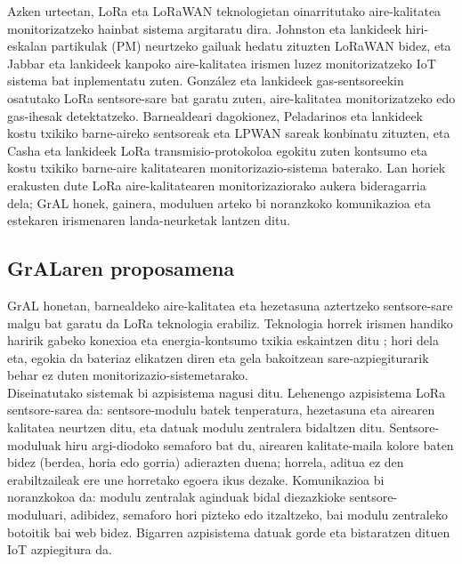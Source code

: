 \documentclass[10pt]{article}
\newcommand{\acpar}[1]{(\acs{#1})\acused{#1}}
\begin{document}
Azken urteetan, \ac{LoRa} eta \ac{LoRaWAN} teknologietan oinarritutako aire-kalitatea monitorizatzeko hainbat sistema argitaratu dira. Johnston eta lankideek \cite{johnston2019} hiri-eskalan partikulak \acpar{PM} neurtzeko gailuak hedatu zituzten \ac{LoRaWAN} bidez, eta Jabbar eta lankideek \cite{jabbar2022} kanpoko aire-kalitatea irismen luzez monitorizatzeko \ac{IoT} sistema bat inplementatu zuten. González eta lankideek \cite{gonzalez2020} gas-sentsoreekin osatutako \ac{LoRa} sentsore-sare bat garatu zuten, aire-kalitatea monitorizatzeko edo gas-ihesak detektatzeko. Barnealdeari dagokionez, Peladarinos eta lankideek \cite{peladarinos2021} kostu txikiko barne-aireko sentsoreak eta \ac{LPWAN} sareak konbinatu zituzten, eta Casha eta lankideek \cite{casha2024} \ac{LoRa} transmisio-protokoloa egokitu zuten kontsumo eta kostu txikiko barne-aire kalitatearen monitorizazio-sistema baterako. Lan horiek erakusten dute \ac{LoRa} aire-kalitatearen monitorizaziorako aukera bideragarria dela; \ac{GrAL} honek, gainera, moduluen arteko bi noranzkoko komunikazioa eta estekaren irismenaren landa-neurketak lantzen ditu.\\

\subsection{\acs{GrAL}aren proposamena}

\ac{GrAL} honetan, barnealdeko aire-kalitatea eta hezetasuna aztertzeko sentsore-sare malgu bat garatu da \ac{LoRa} teknologia erabiliz. Teknologia horrek irismen handiko haririk gabeko konexioa eta energia-kontsumo txikia eskaintzen ditu \cite{raza2017,adelantado2017}; hori dela eta, egokia da bateriaz elikatzen diren eta gela bakoitzean sare-azpiegiturarik behar ez duten monitorizazio-sistemetarako.\\

Diseinatutako sistemak bi azpisistema nagusi ditu. Lehenengo azpisistema \ac{LoRa} sentsore-sarea da: sentsore-modulu batek tenperatura, hezetasuna eta airearen kalitatea neurtzen ditu, eta datuak modulu zentralera bidaltzen ditu. Sentsore-moduluak hiru argi-diodoko semaforo bat du, airearen kalitate-maila kolore baten bidez (berdea, horia edo gorria) adierazten duena; horrela, aditua ez den erabiltzaileak ere une horretako egoera ikus dezake. Komunikazioa bi noranzkokoa da: modulu zentralak aginduak bidal diezazkioke sentsore-moduluari, adibidez, semaforo hori pizteko edo itzaltzeko, bai modulu zentraleko botoitik bai web bidez. Bigarren azpisistema datuak gorde eta bistaratzen dituen \ac{IoT} azpiegitura da.\\
\end{document}
